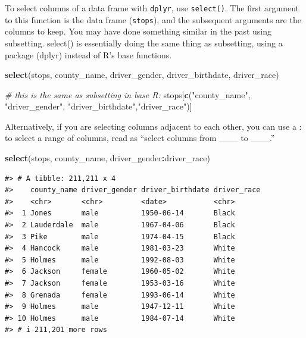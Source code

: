 \documentclass[
]{book}
\newenvironment{Shaded}{\begin{snugshade}}{\end{snugshade}}
\newcommand{\CommentTok}[1]{\textcolor[rgb]{0.56,0.35,0.01}{\textit{#1}}}
\newcommand{\FunctionTok}[1]{\textcolor[rgb]{0.13,0.29,0.53}{\textbf{#1}}}
\newcommand{\NormalTok}[1]{#1}
\newcommand{\SpecialCharTok}[1]{\textcolor[rgb]{0.81,0.36,0.00}{\textbf{#1}}}
\newcommand{\StringTok}[1]{\textcolor[rgb]{0.31,0.60,0.02}{#1}}
\begin{document}
To select columns of a data frame with \texttt{dplyr}, use \texttt{select()}. The first argument to this function is the data frame (\texttt{stops}), and the subsequent arguments are the columns to keep. You may have done something similar in the past using subsetting. select() is essentially doing the same thing as subsetting, using a package (dplyr) instead of R's base functions.

\begin{Shaded}
\begin{Highlighting}[]
\FunctionTok{select}\NormalTok{(stops, county\_name, driver\_gender, driver\_birthdate, driver\_race)}

\CommentTok{\# this is the same as subsetting in base R:}
\NormalTok{stops[}\FunctionTok{c}\NormalTok{(}\StringTok{"county\_name"}\NormalTok{, }\StringTok{"driver\_gender"}\NormalTok{, }\StringTok{"driver\_birthdate"}\NormalTok{,}\StringTok{"driver\_race"}\NormalTok{)]}
\end{Highlighting}
\end{Shaded}

Alternatively, if you are selecting columns adjacent to each other, you can use a : to select a range of columns, read as ``select columns from \_\_\_ to \_\_\_.''

\begin{Shaded}
\begin{Highlighting}[]
\FunctionTok{select}\NormalTok{(stops, county\_name, driver\_gender}\SpecialCharTok{:}\NormalTok{driver\_race)}
\end{Highlighting}
\end{Shaded}

\begin{verbatim}
#> # A tibble: 211,211 x 4
#>    county_name driver_gender driver_birthdate driver_race
#>    <chr>       <chr>         <date>           <chr>      
#>  1 Jones       male          1950-06-14       Black      
#>  2 Lauderdale  male          1967-04-06       Black      
#>  3 Pike        male          1974-04-15       Black      
#>  4 Hancock     male          1981-03-23       White      
#>  5 Holmes      male          1992-08-03       White      
#>  6 Jackson     female        1960-05-02       White      
#>  7 Jackson     female        1953-03-16       White      
#>  8 Grenada     female        1993-06-14       White      
#>  9 Holmes      male          1947-12-11       White      
#> 10 Holmes      male          1984-07-14       White      
#> # i 211,201 more rows
\end{verbatim}
\end{document}
